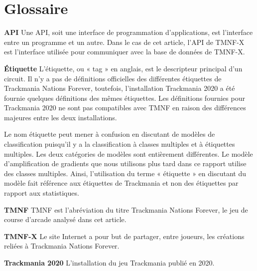 \documentclass[
  oneside,
  open=any]{scrreprt}
\renewcommand*\contentsname{Table des matières}
\newcommand\contentsname{Table des matières}
\begin{document}

\renewcommand*\contentsname{Table des matières}
{
\hypersetup{linkcolor=}
\setcounter{tocdepth}{2}
\tableofcontents
}

\begin{verbatim}
\end{verbatim}

\chapter{Glossaire}\label{glossaire}

\textbf{API}\quad{} Une API, soit une interface de programmation
d'applications, est l'interface entre un programme et un autre. Dans le
cas de cet article, l'API de TMNF-X est l'interface utilisée pour
communiquer avec la base de données de TMNF-X.

\quad

\textbf{Étiquette}\quad{} L'étiquette, ou « tag » en anglais, est le
descripteur principal d'un circuit. Il n'y a pas de définitions
officielles des différentes étiquettes de Trackmania Nations Forever,
toutefois, l'installation Trackmania 2020 a été fournie quelques
définitions des mêmes étiquettes. Les définitions fournies pour
Trackmania 2020 ne sont pas compatibles avec TMNF en raison des
différences majeures entre les deux installations.

Le nom étiquette peut mener à confusion en discutant de modèles de
classification puisqu'il y a la classification à classes multiples et à
étiquettes multiples. Les deux catégories de modèles sont entièrement
différentes. Le modèle d'amplification de gradients que nous utilisons
plus tard dans ce rapport utilise des classes multiples. Ainsi,
l'utilisation du terme « étiquette » en discutant du modèle fait
référence aux étiquettes de Trackmania et non des étiquettes par rapport
aux statistiques.

\quad

\textbf{TMNF}\quad{} TMNF est l'abréviation du titre Trackmania Nations
Forever, le jeu de course d'arcade analysé dans cet article.

\quad

\textbf{TMNF-X}\quad{} Le site Internet a pour but de partager, entre
joueurs, les créations reliées à Trackmania Nations Forever.

\quad

\textbf{Trackmania 2020}\quad{} L'installation du jeu Trackmania publié
en 2020.
\end{document}
